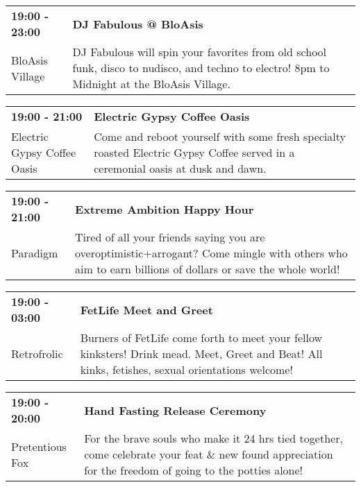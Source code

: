 \begin{tabular}{ p{1in} p{2.2in} }
    \textbf{19:00 - 23:00} & \textbf{DJ Fabulous @ BloAsis} \\
    BloAsis Village \newline  & DJ Fabulous will spin your favorites from old school funk, disco to nudisco, and techno to electro! 8pm to Midnight at the BloAsis Village. \\
    \hline 
\end{tabular}
    
\begin{tabular}{ p{1in} p{2.2in} }
    \textbf{19:00 - 21:00} & \textbf{Electric Gypsy Coffee Oasis} \\
    Electric Gypsy Coffee Oasis \newline  & Come and reboot yourself with some fresh specialty roasted Electric Gypsy Coffee served in a ceremonial oasis at dusk and dawn. \\
    \hline 
\end{tabular}
    
\begin{tabular}{ p{1in} p{2.2in} }
    \textbf{19:00 - 21:00} & \textbf{Extreme Ambition Happy Hour} \\
    Paradigm \newline  & Tired of all your friends saying you are overoptimistic+arrogant? Come mingle with others who aim to earn billions of dollars or save the whole world! \\
    \hline 
\end{tabular}
    
\begin{tabular}{ p{1in} p{2.2in} }
    \textbf{19:00 - 03:00} & \textbf{FetLife Meet and Greet} \\
    Retrofrolic \newline  & Burners of FetLife come forth to meet your fellow kinksters!  Drink mead. Meet, Greet and Beat!  All kinks, fetishes, sexual orientations welcome! \\
    \hline 
\end{tabular}
    
\begin{tabular}{ p{1in} p{2.2in} }
    \textbf{19:00 - 20:00} & \textbf{Hand Fasting Release Ceremony} \\
    Pretentious Fox \newline  & For the brave souls who make it 24 hrs tied together, come celebrate your feat \& new found appreciation for the freedom of going to the potties alone! \\
    \hline 
\end{tabular}
    
